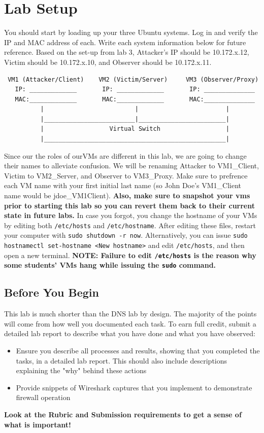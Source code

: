 \section{Lab Setup}
You should start by loading up your three Ubuntu systems. Log in and verify the IP and MAC address of each. Write each system information below for future reference. Based on the set-up from lab 3, Attacker's IP should be 10.172.x.12, Victim should be 10.172.x.10, and Observer should be 10.172.x.11.

\begin{verbatim}
 VM1 (Attacker/Client)    VM2 (Victim/Server)     VM3 (Observer/Proxy)
   IP: _____________       IP: _____________       IP: ______________
   MAC:_____________       MAC:_____________       MAC:______________
          |                         |                        |
          |_________________________|________________________|
          |                  Virtual Switch                  |
          |__________________________________________________|
\end{verbatim}
Since our the roles of ourVMs are different in this lab, we are going to change their names to alleviate confusion. We will be renaming Attacker to VM1\_Client, Victim to VM2\_Server, and Observer to VM3\_Proxy. Make sure to prefrence each VM name with your first initial last name (so John Doe's VM1\_Client name would be jdoe\_VM1Client). \textbf{Also, make sure to snapshot your vms prior to starting this lab so you can revert them back to their current state in future labs.} In case you forgot, you change the hostname of your VMs by editing both {\tt /etc/hosts} and {\tt /etc/hostname}. After editing these files, restart your computer with {\tt sudo shutdown -r now}. Alternatively, you can issue {\tt sudo hostnamectl set-hostname <New hostname>} and edit {\tt /etc/hosts}, and then open a new terminal. \textbf{NOTE: Failure to edit {\tt /etc/hosts} is the reason why some students' VMs hang while issuing the {\tt sudo} command.}

\subsection{Before You Begin}
This lab is much shorter than the DNS lab by design.  The majority of the points will come from how well you documented each task.  To earn full credit, submit a detailed lab report to describe what you have
done and what you have observed:
\begin{itemize}
\item Ensure you describe all processes and results, showing that you completed the tasks, in a detailed lab report. This should also include descriptions explaining the "why" behind these actions
\item Provide snippets of Wireshark captures that you implement to demonstrate firewall operation
\end{itemize}
\textbf{Look at the Rubric and Submission requirements to get a sense of what is important!}

